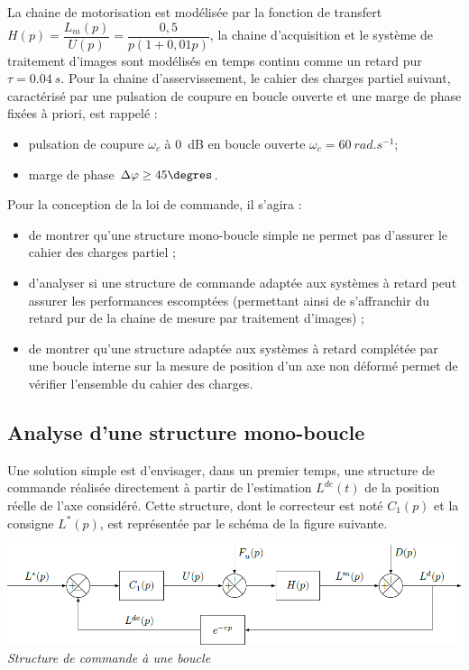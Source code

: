 \begin{multicols}{2}
La chaine de motorisation est modélisée par la fonction de transfert $H(p)=\dfrac{L_m(p)}{U(p)}=\dfrac{0,5}{p\left( 1+0,01 p\right)}$, la chaine d'acquisition et le système de traitement d’images sont modélisés en temps continu comme un retard pur $\tau=\SI{0,04}{s}$.
Pour la chaine d’asservissement, le cahier des charges partiel suivant, caractérisé par une pulsation de coupure en boucle ouverte et une marge de phase fixées à priori, est rappelé :
\begin{itemize}
\item pulsation de coupure $\omega_c$ à \SI{0}{dB} en boucle ouverte $\omega_c = \SI{60}{rad.s^{-1}}$;
\item marge de phase $\Delta \varphi \geq 45 \degres$.
\end{itemize}


\ifcolle
\else
Pour la conception de la loi de commande, il s’agira :
\begin{itemize}
\item de montrer qu’une structure mono-boucle simple ne permet pas d’assurer le cahier des charges partiel ;
\item d’analyser si une structure de commande adaptée aux systèmes à retard peut assurer les performances
escomptées (permettant ainsi de s’affranchir du retard pur de la chaine de mesure par traitement d’images) ;
\item de montrer qu’une structure adaptée aux systèmes à retard complétée par une boucle interne sur la mesure
de position d’un axe non déformé permet de vérifier l’ensemble du cahier des charges.
\end{itemize}

\fi

\subsection*{Analyse d’une structure mono-boucle}

Une solution simple est d’envisager, dans un premier temps, une structure de commande réalisée directement à
partir de l’estimation $L^{de}(t)$ de la position réelle de l’axe considéré. Cette structure, dont le correcteur est noté
$C_1(p)$ et la consigne $L^{*}(p)$, est représentée par le schéma de la figure suivante.



\begin{center}
\includegraphics[width=\linewidth]{images/fig_03}
\textit{Structure de commande à une boucle}
\end{center}


\end{multicols}
